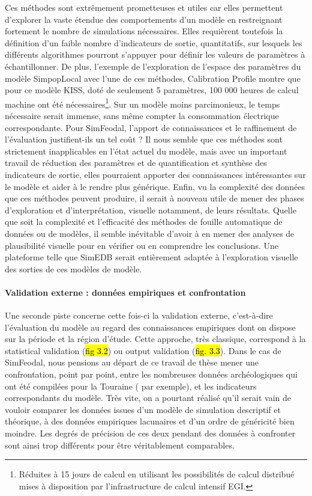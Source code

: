 \noindent Ces méthodes sont extrêmement prometteuses et utiles car elles permettent d'explorer la vaste étendue des comportements d'un modèle en restreignant fortement le nombre de simulations nécessaires.
Elles requièrent toutefois la définition d'un faible nombre d'indicateurs de sortie, quantitatifs, sur lesquels les différents algorithmes pourront s'appuyer pour définir les valeurs de paramètres à échantillonner.
De plus, l'exemple de l'exploration de l'espace des paramètres du modèle SimpopLocal \autocite{schmitt_modelisation_2014} avec l'une de ces méthodes, \og Calibration Profile\fg{} \autocite{reuillon_new_2015} montre que pour ce modèle KISS, doté de seulement 5 paramètres, 100 000 heures de calcul machine ont été nécessaires\footnote{
	Réduites à 15 jours de calcul en utilisant les possibilités de calcul distribué mises à disposition par l'infrastructure de calcul intensif EGI.
}.
Sur un modèle moins parcimonieux, le temps nécessaire serait immense, sans même compter la consommation électrique correspondante.
Pour SimFeodal, l'apport de connaissances et le raffinement de l'évaluation justifient-ils un tel coût ?
Il nous semble que ces méthodes sont strictement inapplicables en l'état actuel du modèle, mais avec un important travail de réduction des paramètres et de quantification et synthèse des indicateurs de sortie, elles pourraient apporter des connaissances intéressantes sur le modèle et aider à le rendre plus générique.
Enfin, vu la complexité des données que ces méthodes peuvent produire, il serait à nouveau utile de mener des phases d'exploration et d'interprétation, visuelle notamment, de leurs résultats.
Quelle que soit la complexité et l'efficacité des méthodes de fouille automatique de données ou de modèles, il semble inévitable d'avoir à en mener des analyses de plausibilité visuelle pour en vérifier ou en comprendre les conclusions.
Une plateforme telle que SimEDB serait entièrement adaptée à l'exploration visuelle des sorties de ces modèles de modèle.

\paragraph{Validation externe : données empiriques et confrontation}
Une seconde piste concerne cette fois-ci la validation externe, c'est-à-dire l'évaluation du modèle au regard des connaissances empiriques dont on dispose sur la période et la région d'étude.
Cette approche, très classique, correspond à la \og statistical validation\fg{} (\hl{fig 3.2}) ou \og output validation\fg{} (\hl{fig. 3.3}).
Dans le cas de SimFeodal, nous pensions au départ de ce travail de thèse mener une confrontation, point par point, entre les nombreuses données archéologiques qui ont été compilées pour la Touraine (\textcite{rodier_modelisation_2010} par exemple), et les indicateurs correspondants du modèle.
Très vite, on a pourtant réalisé qu'il serait vain de vouloir comparer les données issues d'un modèle de simulation descriptif et théorique, à des données empiriques lacunaires et d'un ordre de généricité bien moindre.
Les degrés de précision de ces deux pendant des données à confronter sont ainsi trop différents pour être véritablement comparables.

